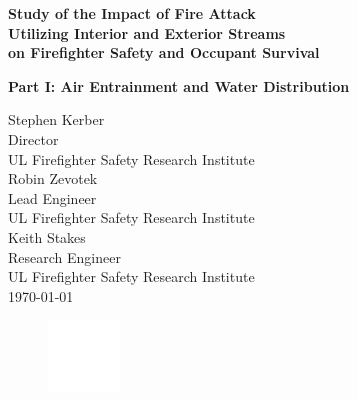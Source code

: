 \documentclass{article}
\begin{document}
\begin{titlepage}
		\huge
		\begin{adjustwidth}{-0.5in}{-0in}
		\color{white}
		\textbf{Study of the Impact of Fire Attack \\ Utilizing Interior and Exterior Streams \\ on Firefighter Safety and Occupant Survival}
		\end{adjustwidth}
		\huge
		\begin{adjustwidth}{-0.5in}{-0in}
		\color{white}
		\textbf{Part I: Air Entrainment and Water Distribution}
		\end{adjustwidth}
		\begin{adjustwidth}{-0.5in}{}
		\color{white}
		\vspace{.2\baselineskip}
		\large
		Stephen Kerber \\
		Director \\
		UL Firefighter Safety Research Institute \\
		\vspace*{.5\baselineskip}
		Robin Zevotek \\
		Lead Engineer \\
		UL Firefighter Safety Research Institute \\ 
		\vspace*{.5\baselineskip}
		Keith Stakes \\
		Research Engineer \\
		UL Firefighter Safety Research Institute \\
		\vspace*{.8\baselineskip}	
		\today
		\vspace*{.8\baselineskip}
		\begin{figure}[h]
			\hspace*{-0.5in}\includegraphics[width=0.75in]{Figures/General/ULLogoWhite.pdf}
		\end{figure}
		\end{adjustwidth}
	\end{titlepage}
\end{document}
